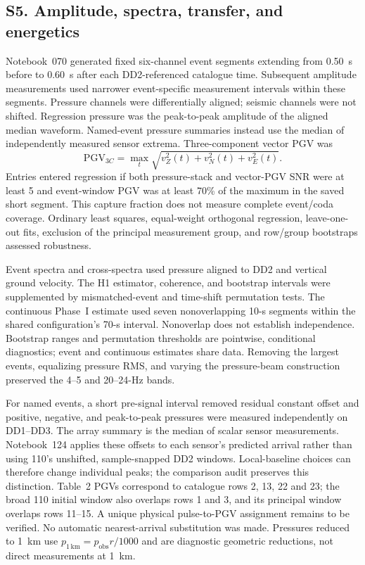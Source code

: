 \documentclass[]{seismica}
\begin{document}
\FloatBarrier
\subsection{S5. Amplitude, spectra, transfer, and energetics}
\label{sec:supp_energy}

Notebook~070 generated fixed six-channel event segments extending from 0.50~s
before to 0.60~s after each DD2-referenced catalogue time. Subsequent amplitude
measurements used narrower event-specific measurement intervals within these
segments. Pressure channels were differentially aligned; seismic
channels were not shifted. Regression pressure was the peak-to-peak amplitude
of the aligned median waveform. Named-event pressure summaries instead use
the median of independently measured sensor extrema.
Three-component vector PGV was
\begin{equation}
 \mathrm{PGV}_{3C}=\max_t\sqrt{v_Z^2(t)+v_N^2(t)+v_E^2(t)}.
\end{equation}
Entries entered regression if both pressure-stack and vector-PGV SNR were at
least 5 and event-window PGV was at least 70\% of the maximum in the saved
short segment. This capture fraction does not measure complete event/coda
coverage. Ordinary least squares,
equal-weight orthogonal regression, leave-one-out fits, exclusion of the
principal measurement group, and row/group bootstraps assessed robustness.

Event spectra and cross-spectra used pressure aligned to DD2 and vertical
ground velocity. The H1 estimator, coherence, and bootstrap intervals were
supplemented by mismatched-event and time-shift permutation tests. The
continuous Phase~I estimate used seven nonoverlapping 10-s segments within
the shared configuration's 70-s interval. Nonoverlap does not establish
independence. Bootstrap ranges and permutation thresholds are pointwise,
conditional diagnostics; event and continuous estimates share data. Removing the
largest events, equalizing pressure RMS, and varying the pressure-beam
construction preserved the 4--5 and 20--24-Hz bands.

For named events, a short pre-signal interval removed residual constant offset
and positive, negative, and peak-to-peak pressures were measured independently
on DD1--DD3. The array summary is the median of scalar sensor measurements.
Notebook~124 applies these offsets to each sensor's predicted arrival rather
than using 110's unshifted, sample-snapped DD2 windows. Local-baseline choices
can therefore change individual peaks; the comparison audit preserves this
distinction. Table~2 PGVs correspond to catalogue rows 2, 13, 22 and 23;
the broad 110 initial window also overlaps rows 1 and 3, and its principal
window overlaps rows 11--15. A unique physical pulse-to-PGV assignment remains
to be verified. No automatic nearest-arrival substitution was made.
Pressures reduced to 1~km use $p_{1\,\mathrm{km}}=p_{\mathrm{obs}}r/1000$ and
are diagnostic geometric reductions, not direct measurements at 1~km.
\end{document}
